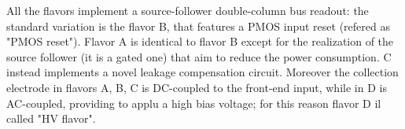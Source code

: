     All the flavors implement a source-follower double-column bus readout: the standard variation is the flavor B, that features a PMOS input reset (refered as "PMOS reset"). Flavor A is identical to flavor B except for the realization of the source follower (it is a gated one) that aim to reduce the power consumption. C instead implements a novel leakage compensation circuit.
    Moreover the collection electrode in flavors A, B, C is DC-coupled to the front-end input, while in D is AC-coupled, providing to applu a high bias voltage; for this reason flavor D il called "HV flavor".


